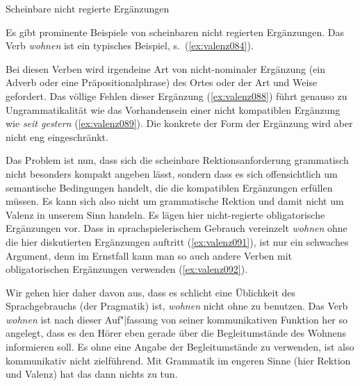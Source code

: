 \begin{Vertiefung}{Scheinbare nicht regierte Ergänzungen}
\label{vert:nregerg}

\noindent Es gibt prominente Beispiele von scheinbaren nicht regierten Ergänzungen.
Das Verb \textit{wohnen} ist ein typisches Beispiel, s.\ (\ref{ex:valenz084}).

\begin{exe}
  \ex\label{ex:valenz084}
  \begin{xlist}
  \end{xlist}
\end{exe}

Bei diesen Verben wird irgendeine Art von nicht-nominaler Ergänzung (\zB ein Adverb oder eine Präpositionalphrase) des Ortes oder der Art und Weise gefordert.
Das völlige Fehlen dieser Ergänzung (\ref{ex:valenz088}) führt genauso zu Ungrammatikalität wie das Vorhandensein einer nicht kompatiblen Ergänzung wie \textit{seit gestern} (\ref{ex:valenz089}).
Die konkrete der Form der Ergänzung wird aber nicht eng eingeschränkt.

Das Problem ist nun, dass sich die scheinbare Rektionsanforderung grammatisch nicht besonders kompakt angeben lässt, sondern dass es sich offensichtlich um semantische Bedingungen handelt, die die kompatiblen Ergänzungen erfüllen müssen.
Es kann sich also nicht um grammatische Rektion und damit nicht um Valenz in unserem Sinn handeln.
Es lägen hier nicht-regierte obligatorische Ergänzungen vor.
Dass in sprachspielerischem Gebrauch vereinzelt \textit{wohnen} ohne die hier diskutierten Ergänzungen auftritt (\ref{ex:valenz091}), ist nur ein schwaches Argument, denn im Ernstfall kann man so auch andere Verben mit obligatorischen Ergänzungen verwenden (\ref{ex:valenz092}).

\begin{exe}
  \ex\label{ex:valenz090}
  \begin{xlist}
  \end{xlist}
\end{exe}

Wir gehen hier daher davon aus, dass es schlicht eine Üblichkeit des Sprachgebrauchs (der Pragmatik) ist, \textit{wohnen} nicht ohne  zu benutzen.
Das Verb \textit{wohnen} ist nach dieser Auf"|fassung von seiner kommunikativen Funktion her so angelegt, dass es den Hörer eben gerade über die Begleitumstände des Wohnens informieren soll.
Es ohne eine Angabe der Begleitumstände zu verwenden, ist also kommunikativ nicht zielführend.
Mit Grammatik im engeren Sinne (hier Rektion und Valenz) hat das dann nichts zu tun.

\end{Vertiefung}

